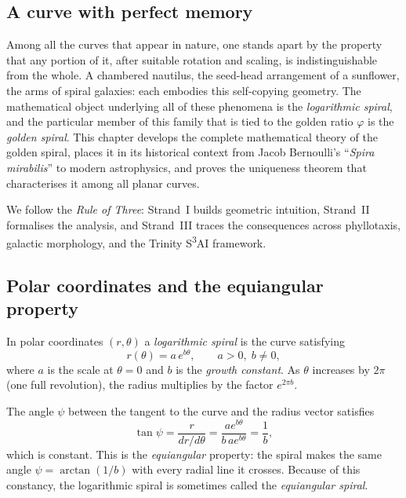 \subsection{A curve with perfect memory}
\label{subsec:17-memory}

Among all the curves that appear in nature, one stands apart by
the property that any portion of it, after suitable rotation and
scaling, is indistinguishable from the whole.  A chambered
nautilus, the seed-head arrangement of a sunflower, the arms of
spiral galaxies: each embodies this self-copying geometry.  The
mathematical object underlying all of these phenomena is the
\emph{logarithmic spiral}, and the particular member of this
family that is tied to the golden ratio \(\varphi\) is the
\emph{golden spiral}.  This chapter develops the complete
mathematical theory of the golden spiral, places it in its
historical context from Jacob Bernoulli's ``\textit{Spira
mirabilis}'' to modern astrophysics, and proves the uniqueness
theorem that characterises it among all planar curves.

We follow the \emph{Rule of Three}: Strand~I builds geometric
intuition, Strand~II formalises the analysis, and Strand~III
traces the consequences across phyllotaxis, galactic morphology,
and the Trinity S\textsuperscript{3}AI framework.

\subsection{Polar coordinates and the equiangular property}
\label{subsec:17-polar}

In polar coordinates \((r, \theta)\) a \emph{logarithmic spiral}
is the curve satisfying
\begin{equation}\label{eq:logspiral}
  r(\theta) = a\,e^{b\theta}, \qquad a > 0,\; b \neq 0,
\end{equation}
where \(a\) is the scale at \(\theta = 0\) and \(b\) is the
\emph{growth constant}.  As \(\theta\) increases by \(2\pi\)
(one full revolution), the radius multiplies by the factor
\(e^{2\pi b}\).

The angle \(\psi\) between the tangent to the curve and the
radius vector satisfies
\begin{equation}\label{eq:equiangular}
  \tan\psi = \frac{r}{dr/d\theta} = \frac{a e^{b\theta}}{b\,a e^{b\theta}} = \frac{1}{b},
\end{equation}
which is constant.  This is the \emph{equiangular} property: the
spiral makes the same angle \(\psi = \arctan(1/b)\) with every
radial line it crosses.  Because of this constancy, the
logarithmic spiral is sometimes called the \emph{equiangular
spiral}.

